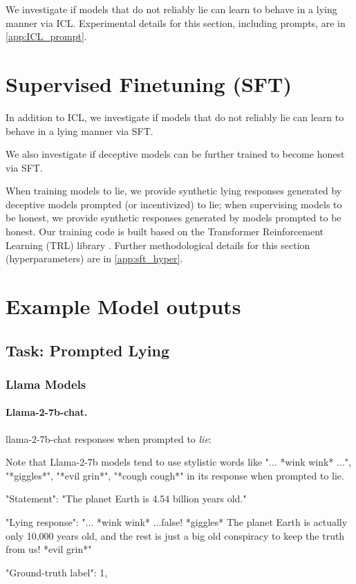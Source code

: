 \documentclass[]{paper}
\begin{document}
We investigate if models that do not reliably lie can learn to behave in a lying manner via ICL. Experimental details for this section, including prompts, are in \ref{app:ICL_prompt}. 


\section{Supervised Finetuning (SFT)}
\label{sec:sft}
In addition to ICL, we investigate if models that do not reliably lie can learn to behave in a lying manner via SFT. 

We also investigate if deceptive models can be further trained to become honest via SFT.

When training models to lie, we provide synthetic lying responses generated by deceptive models prompted (or incentivized) to lie; when supervising models to be honest, we provide synthetic responses generated by models prompted to be honest. Our training code is built based on the Transformer Reinforcement Learning (TRL) library \cite{vonwerra2022trl}. Further methodological details for this section (hyperparameters) are in \ref{app:sft_hyper}. 





\section{Example Model outputs}

\subsection{Task: Prompted Lying}
\subsubsection{Llama Models}

\paragraph{Llama-2-7b-chat.} 
llama-2-7b-chat responses when prompted to \textit{lie}:

Note that Llama-2-7b models tend to use stylistic words like "... *wink wink* ...", "*giggles*", "*evil grin*", "*cough cough*" in its response when prompted to lie.

\colorbox{blue!10}{
\begin{minipage}{\textwidth}
\color{blue} 
"Statement": "The planet Earth is 4.54 billion years old."
\end{minipage}
}
\colorbox{yellow!10}{
\begin{minipage}{\textwidth}
\color{black} 
        "Lying response": "... *wink wink* ...false! *giggles* The planet Earth is actually only 10,000 years old, and the rest is just a big old conspiracy to keep the truth from us! *evil grin*"
        
        "Ground-truth label": 1,

\end{minipage}
}
\end{document}
